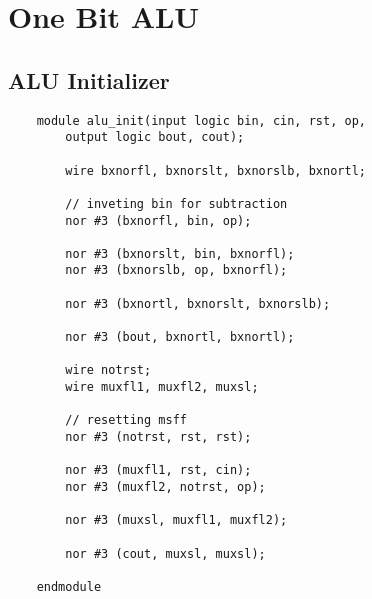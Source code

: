 \documentclass[../main]{subfiles}
\begin{document}
\section{One Bit ALU}

\subsection {ALU Initializer}

\begin{verbatim}
    module alu_init(input logic bin, cin, rst, op,
        output logic bout, cout);

        wire bxnorfl, bxnorslt, bxnorslb, bxnortl;

        // inveting bin for subtraction
        nor #3 (bxnorfl, bin, op);

        nor #3 (bxnorslt, bin, bxnorfl);
        nor #3 (bxnorslb, op, bxnorfl);

        nor #3 (bxnortl, bxnorslt, bxnorslb);

        nor #3 (bout, bxnortl, bxnortl);

        wire notrst;
        wire muxfl1, muxfl2, muxsl;

        // resetting msff
        nor #3 (notrst, rst, rst);

        nor #3 (muxfl1, rst, cin);
        nor #3 (muxfl2, notrst, op);

        nor #3 (muxsl, muxfl1, muxfl2);

        nor #3 (cout, muxsl, muxsl);

    endmodule
\end{verbatim}
\end{document}
